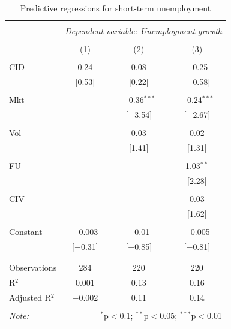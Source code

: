 \documentclass[12pt]{article}
\begin{document}
\begin{table}[!htbp] \centering 
  \caption{Predictive regressions for short-term unemployment} 
  \label{} 
\begin{tabular}{@{\extracolsep{5pt}}lccc} 
\\[-1.8ex]\hline 
\hline \\[-1.8ex] 
 & \multicolumn{3}{c}{\textit{Dependent variable: Unemployment growth}} \\ 
\cline{2-4} 
\\[-1.8ex] & (1) & (2) & (3)\\ 
\hline \\[-1.8ex] 
 CID & 0.24 & 0.08 & $-$0.25 \\ 
  & [0.53] & [0.22] & [$-$0.58] \\ 
  & & & \\ 
 Mkt &  & $-$0.36$^{***}$ & $-$0.24$^{***}$ \\ 
  &  & [$-$3.54] & [$-$2.67] \\ 
  & & & \\ 
 Vol &  & 0.03 & 0.02 \\ 
  &  & [1.41] & [1.31] \\ 
  & & & \\ 
 FU &  &  & 1.03$^{**}$ \\ 
  &  &  & [2.28] \\ 
  & & & \\ 
 CIV &  &  & 0.03 \\ 
  &  &  & [1.62] \\ 
  & & & \\ 
 Constant & $-$0.003 & $-$0.01 & $-$0.005 \\ 
  & [$-$0.31] & [$-$0.85] & [$-$0.81] \\ 
  & & & \\ 
\hline \\[-1.8ex] 
Observations & 284 & 220 & 220 \\ 
R$^{2}$ & 0.001 & 0.13 & 0.16 \\ 
Adjusted R$^{2}$ & $-$0.002 & 0.11 & 0.14 \\ 
\hline 
\hline \\[-1.8ex] 
\textit{Note:}  & \multicolumn{3}{r}{$^{*}$p$<$0.1; $^{**}$p$<$0.05; $^{***}$p$<$0.01} \\ 
\end{tabular} 
\end{table}
\end{document}
